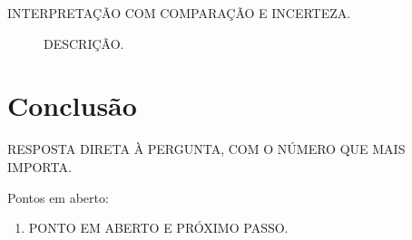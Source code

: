 \documentclass[12pt, a4paper]{article}
\let\oldsection\section
\renewcommand{\section}{\FloatBarrier\oldsection}
\begin{document}
INTERPRETAÇÃO COM COMPARAÇÃO E INCERTEZA.

\begin{figure}[H]
\centering
{}
\caption{DESCRIÇÃO.}
\label{fig:principal}
\end{figure}

\section{Conclusão}

RESPOSTA DIRETA À PERGUNTA, COM O NÚMERO QUE MAIS IMPORTA.

Pontos em aberto:

\begin{enumerate}
  \item PONTO EM ABERTO E PRÓXIMO PASSO.
\end{enumerate}
\end{document}

